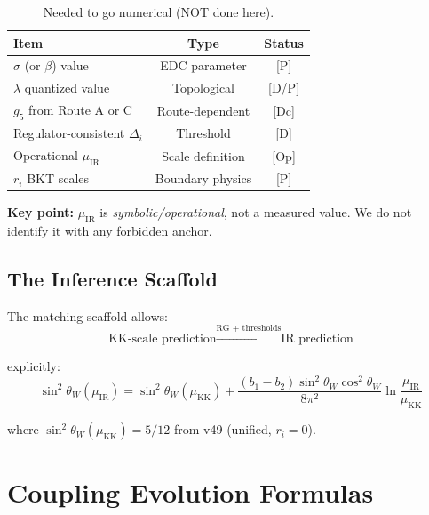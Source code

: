 \documentclass[11pt,a4paper]{article}
\begin{document}
\begin{table}[ht]
\centering
\caption{Needed to go numerical (NOT done here).}
\label{tab:needed}
\begin{tabular}{lcc}
\toprule
\textbf{Item} & \textbf{Type} & \textbf{Status} \\
\midrule
$\sigma$ (or $\beta$) value & EDC parameter & [P] \\
$\lambda$ quantized value & Topological & [D/P] \\
$g_5$ from Route A or C & Route-dependent & [Dc] \\
Regulator-consistent $\Delta_i$ & Threshold & [D] \\
Operational $\mu_{\text{IR}}$ & Scale definition & [Op] \\
$r_i$ BKT scales & Boundary physics & [P] \\
\bottomrule
\end{tabular}
\end{table}

\textbf{Key point:} $\mu_{\text{IR}}$ is \textit{symbolic/operational}, not a measured value.
We do not identify it with any forbidden anchor.

\subsection{The Inference Scaffold}
\label{subsec:scaffold}

The matching scaffold allows:
\begin{equation}
\label{eq:scaffold}
\boxed{\text{KK-scale prediction} \xrightarrow{\text{RG + thresholds}} \text{IR prediction}}
\end{equation}

explicitly:
\begin{equation}
\label{eq:sin2-ir}
\sin^2\theta_W(\mu_{\text{IR}}) = \sin^2\theta_W(\mu_{\text{KK}}) + \frac{(b_1 - b_2)\sin^2\theta_W \cos^2\theta_W}{8\pi^2}\ln\frac{\mu_{\text{IR}}}{\mu_{\text{KK}}}
\end{equation}

where $\sin^2\theta_W(\mu_{\text{KK}}) = 5/12$ from v49 (unified, $r_i = 0$).

\section{Coupling Evolution Formulas}
\label{sec:evolution}
\end{document}
